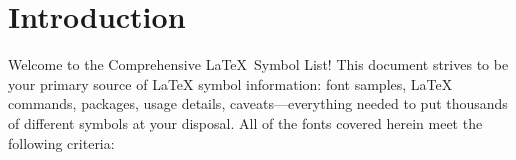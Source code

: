 \documentclass{article}
\newcommand{\doctitle}{Comprehensive \LaTeX\ Symbol List}  %
\newcommand{\latex}{\LaTeX\index{LaTeX=\string\LaTeX}\xspace}
\newif\ifTIPA
\begin{document}
\ifTIPA
  \index{advancing|see{\texttt{\string\textadvancing}}}
  \index{bullseye|see{\texttt{\string\textbullseye}}}
  \index{lowering|see{\texttt{\string\textlowering}}}
  \index{pipe|see{\texttt{\string\textpipe}}}
  \index{raising|see{\texttt{\string\textraising}}}
  \index{retracting|see{\texttt{\string\textretracting}}}
  \index{seagull|see{\texttt{\string\textseagull}}}
\fi    %


\section{Introduction}

Welcome to the \doctitle!  This document strives to be your primary
source of \latex{} symbol information: font samples, \latex{}
commands, packages, usage details, caveats---everything needed to put
thousands of different symbols at your disposal.  All of the fonts
covered herein meet the following criteria:
\end{document}
